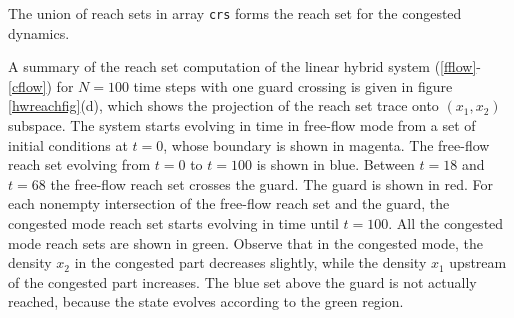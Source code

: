The union of reach sets in array {\tt crs} forms the reach set for
the congested dynamics.

A summary of
 the reach set computation of the
linear hybrid system (\ref{fflow}-\ref{cflow}) for $N=100$ time steps
with one guard crossing is given in figure \ref{hwreachfig}(d),
which shows the projection of the reach set trace onto $(x_1,x_2)$ subspace.
The system starts evolving in time in free-flow mode from a set of
initial conditions at $t=0$, whose boundary is shown in magenta.
The free-flow reach set evolving from $t=0$ to $t=100$ is shown in blue.
Between  $t=18$ and $t=68$ the free-flow reach set crosses the guard.
The guard is shown in red.
For each  nonempty intersection of the free-flow reach set and the guard,
the congested mode reach set starts evolving in time until $t=100$.
All the congested mode reach sets are shown in green.
Observe that in the congested mode, the density $x_2$ in the congested part
 decreases slightly, while the density $x_1$ upstream of the congested part
 increases.
The blue  set above the guard is not actually reached,
because the state evolves according to the green region.
